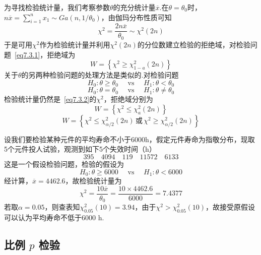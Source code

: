 为寻找检验统计量，我们考察参数$\theta$的充分统计量$\overline { x }$.在$\theta=\theta_{ 0 }$时，$n \overline { x } = \sum _ { i = 1 } ^ { n } x _ { 1 } \sim G a \left( n , 1 / \theta _ { 0 } \right)$，由伽玛分布性质可知
\begin{equation}\label{eq7.3.2}
\chi ^ { 2 } = \frac { 2 n \overline { x } } { \theta _ { 0 } } \sim \chi ^ { 2 } ( 2 n )
\end{equation}
于是可用$\chi ^ { 2 }$作为检验统计量并利用$\chi ^ { 2 }(2n)$的分位数建立检验的拒绝域，对检验问题~\ref{eq7.3.1}，拒绝域为
\begin{equation}\label{eq7.3.3}
W = \left\{ \chi ^ { 2 } \geq \chi _ { 1 - a } ^ { 2 } ( 2 n ) \right\}
\end{equation}
关于$\theta$的另两种检验问题的处理方法是类似的.对检验问题
\begin{equation}\label{eq7.3.4}
H _ { 0 } : \theta \geq \theta _ { 0 } \quad \text { vs } \quad H _ { 1 } : \theta < \theta _ { 0 }
\end{equation}
\begin{equation}\label{eq7.3.5}
H _ { 0 } : \theta = \theta _ { 0 } \quad \text { vs } \quad H _ { 1 } : \theta \ne  \theta _ { 0 }
\end{equation}
检验统计量仍然是~\ref{eq7.3.2}的$\chi ^ { 2 }$，拒绝域分别为
\begin{equation}\label{eq7.3.6}
W = \left\{ \chi ^ { 2 } \leq \chi _ { a } ^ { 2 } ( 2 n ) \right\}
\end{equation}
\begin{equation}\label{eq7.3.7}
W=\left\{\chi^2\leq\chi_{\alpha/2}^{2}
\left(2n\right)\,\text{或}\,\chi^2\geq\chi_{\alpha/2}^{2}\left(2n\right)\right\}
\end{equation}
\begin{example}\label{exam7.3.1}
	设我们要检验某种元件的平均寿命不小于6000h，假定元件寿命为指敬分布，现取5个元件投人试验，观测到如下5个失效时间（h）
	\[395 \quad 4094 \quad 119 \quad 11572 \quad 6133\]
	这是一个假设检验问题，检验的假设为
	\[H _ { 0 } : \theta \geq 6000 \quad \text { vs } \quad H _ { 1 } : \theta < 6000\]
	经计算，$\overline{ x }=4462.6$，故检验统计量为
	\[\chi ^ { 2 } = \frac { 10 \overline { x } } { \theta _ { 0 } } = \frac { 10 \times 4462.6 } { 6000 } = 7.4377\]
	若取$\alpha = 0.05$，则查表知$\chi _ { 0.05 } ^ { 2 } ( 10 ) = 3.94$，由于$\chi^{2}>\chi _ { 0.05 } ^ { 2 } ( 10 ) $，故接受原假设可以认为平均寿命不低于6000 h.
\end{example}

\subsection{比例 $p$ 检验\label{sec:7.3.2}}

